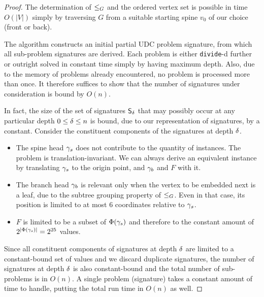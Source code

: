 \begin{proof}
The determination of $\leq_G$ and the ordered vertex set  is possible in time $O(|V|)$ simply by traversing $G$ from a suitable starting spine $v_0$ of our choice (front or back).

The algorithm constructs an initial partial UDC problem signature, from which all sub-problem signatures are derived. Each problem is either \texttt{divide}-d further or outright solved in constant time simply by having maximum depth. Also, due to the memory of problems already encountered, no problem is processed more than once. It therefore suffices to show that the number of signatures under consideration is bound by $O(n)$.

In fact, the size of the set of signatures $\DataSty{S}_\depth$ that may possibly occur at any particular depth $0 \leq \delta \leq n$ is bound, due to our representation of signatures, by a constant. Consider the constituent components of the signatures at depth $\delta$.

\begin{itemize}
    \item The spine head $\gamma_s$ does not contribute to the quantity of instances. The problem is translation-invariant. We can always derive an equivalent instance by translating $\gamma_s$ to the origin point, and $\gamma_b$ and $F$ with it.
    \item The branch head $\gamma_b$ is relevant only when the vertex to be embedded next is a leaf, due to the subtree grouping property of $\leq_G$. Even in that case, its position is limited to at most 6 coordinates relative to $\gamma_s$.
    \item $F$ is limited to be a subset of $\Phi(\gamma_s)$ and therefore to the constant amount of $2^{|\Phi(\gamma_s)|} = 2^{25}$ values.
\end{itemize}

Since all constituent components of signatures at depth $\delta$ are limited to a constant-bound set of values and we discard duplicate signatures, the number of signatures at depth $\delta$ is also constant-bound and the total number of sub-problems is in $O(n)$. A single problem (signature) takes a constant amount of time to handle, putting the total run time in $O(n)$ as well.
\end{proof}

